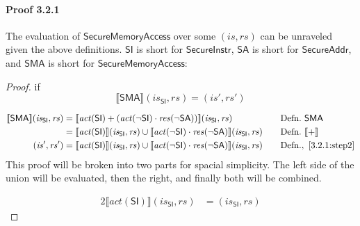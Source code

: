 \documentclass[12pt, letterpaper]{article}
\newcommand\interp[1]{\llbracket #1 \rrbracket}
\begin{document}
 \paragraph{Proof 3.2.1}
     The evaluation of $\mathsf{SecureMemoryAccess}$ over some $(\mathit{is},\mathit{rs})$ can be unraveled given the above definitions.  $\mathsf{SI}$ is short for $\mathsf{SecureInstr}$, $\mathsf{SA}$ is short for $\mathsf{SecureAddr}$, and $\mathsf{SMA}$ is short for $\mathsf{SecureMemoryAccess}$:\\
 \begin{proof}
     if
     \[
     \interp{ \mathsf{SMA} } (\mathit{is_{\mathsf{SI}}}, \mathit{rs})
     =
     (\mathit{is}', \mathit{rs}')
     \]
 \par\nobreak
 {\fontsize{10pt}{12pt}\selectfont
 \begin{alignat}{2}
     \setcounter{equation}{0}
     \label{3.2.1:step1}
     \interp{ \mathsf{SMA} } (\mathit{is_{\mathsf{SI}}}, \mathit{rs})
     &=
     \interp{ \mathit{act}(\mathsf{SI}) +
     (\mathit{act}(\neg\mathsf{SI}) \cdot
      \mathit{res}(\neg\mathsf{SA})) } (\mathit{is_{\mathsf{SI}}}, \mathit{rs})
     &&\quad \text{Defn.}\ \mathsf{SMA}
     \\
     \label{3.2.1:step2}
     &=
     \interp{ \mathit{act}(\mathsf{SI}) } (\mathit{is_{\mathsf{SI}}}, \mathit{rs}) \cup %
     \interp{ \mathit{act}(\neg\mathsf{SI}) \cdot
      \mathit{res}(\neg\mathsf{SA}) } (\mathit{is_{\mathsf{SI}}}, \mathit{rs})
     &&\quad \text{Defn.}\ \interp{+}
     \\
     \label{3.2.1:step3}
     (\mathit{is}', \mathit{rs}')
     &=
     \interp{ \mathit{act}(\mathsf{SI}) } (\mathit{is_{\mathsf{SI}}}, \mathit{rs}) \cup %
     \interp{ \mathit{act}(\neg\mathsf{SI}) \cdot
      \mathit{res}(\neg\mathsf{SA}) } (\mathit{is_{\mathsf{SI}}}, \mathit{rs})
     &&\quad \text{Defn.},\ \ref{3.2.1:step2}
 \end{alignat}
 }%
     This proof will be broken into two parts for spacial simplicity.  The left side of the union will be evaluated, then the right, and finally both will be combined.
 \par\nobreak
 {\fontsize{10pt}{12pt}\selectfont
 \begin{alignat}{2}
     \label{3.2.1:step4}
     \interp{ \mathit{act} (\mathsf{SI}) } (\mathit{is_{\mathsf{SI}}}, \mathit{rs})  
     &=
     (\mathit{is_{\mathsf{SI}}}, \mathit{rs})   %

\end{alignat}}
\end{proof}
\end{document}
